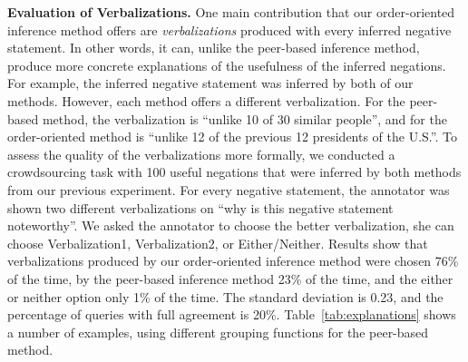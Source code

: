\noindent
\textbf{Evaluation of Verbalizations.} One main contribution that our order-oriented inference method offers are \textit{verbalizations} produced with every inferred negative statement. In other words, it can, unlike the peer-based inference method, produce more concrete explanations of the usefulness of the inferred negations. For example, the inferred negative statement   was inferred by both of our methods. However, each method offers a different verbalization. For the peer-based method, the verbalization is ``unlike 10 of 30 similar people'', and for the order-oriented method is ``unlike 12 of the previous 12 presidents of the U.S.''. To assess the quality of the verbalizations more formally, we conducted a crowdsourcing task with 100 useful negations that were inferred by both methods from our previous experiment. For every negative statement, the annotator was shown two different verbalizations on ``why is this negative statement noteworthy''. We asked the annotator to choose the better verbalization, she can choose Verbalization1, Verbalization2, or Either/Neither. Results show that verbalizations produced by our order-oriented inference method were chosen 76\% of the time, by the peer-based inference method 23\% of the time, and the either or neither option only 1\% of the time. The standard deviation is 0.23, and the percentage of queries with full agreement is 20\%. Table~\ref{tab:explanations} shows a number of examples, using different grouping functions for the peer-based method.

